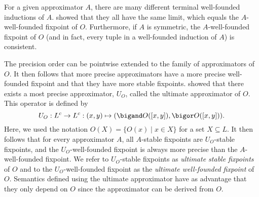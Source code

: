For a given approximator $A$, there are many different terminal well-founded inductions of $A$.
\cite{lpnmr/DeneckerV07}  showed that they all have the same limit, which equals the $A$-well-founded fixpoint of $O$. Furthermore, if $A$ is symmetric, the $A$-well-founded fixpoint of $O$ (and in fact, every tuple in a well-founded induction of $A$) is consistent. 

The precision order can be pointwise extended to the family of approximators of $O$. It then follows that more precise approximators have a more precise well-founded fixpoint and that they have more stable fixpoints. 
\cite{DeneckerMT04} showed that there exists a most precise approximator, $U_O$, called the ultimate approximator of $O$. 
This operator is defined by \[U_O: L^c\to L^c: (x,y)\mapsto (\bigand O([x,y]), \bigor O([x,y])).\]
Here, we used the notation $O(X) = \{O(x)\mid x\in X\}$ for a set $X\subseteq L$.
 It then follows that for every
approximator $A$, all  $A$-stable fixpoints are $U_O$-stable fixpoints, and  the $U_O$-well-founded fixpoint is always more precise than the $A$-well-founded fixpoint.  
We refer to $U_O$-stable fixpoints as \emph{ultimate stable fixpoints} of $O$ and to the $U_O$-well-founded fixpoint as the \emph{ultimate well-founded fixpoint} of $O$.
Semantics defined using the ultimate approximator have as advantage that they only depend on $O$ since the approximator can be derived from $O$.

